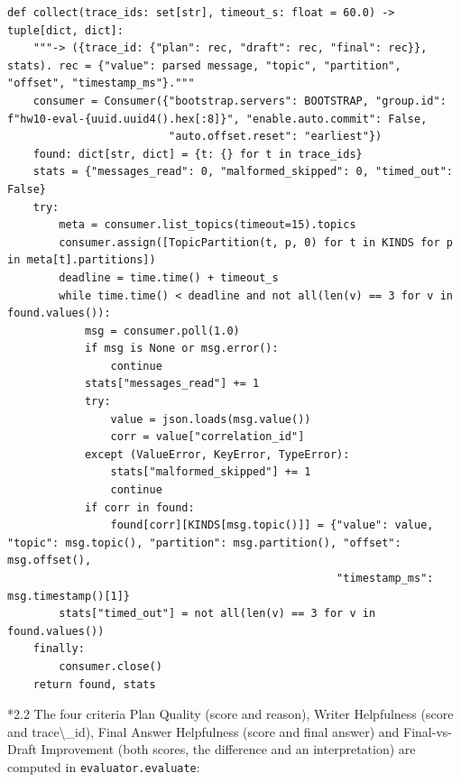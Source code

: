 \documentclass[11pt]{article}
\makeatletter
\renewcommand\subsection{\@startsection{subsection}{2}{\z@}{-2.2ex \@plus -1ex \@minus -.2ex}{0.8ex \@plus.2ex}{\normalfont\fontsize{12}{14.5}\selectfont\bfseries}}
\makeatother
\begin{document}
\begin{lstlisting}
def collect(trace_ids: set[str], timeout_s: float = 60.0) -> tuple[dict, dict]:
    """-> ({trace_id: {"plan": rec, "draft": rec, "final": rec}}, stats). rec = {"value": parsed message, "topic", "partition", "offset", "timestamp_ms"}."""
    consumer = Consumer({"bootstrap.servers": BOOTSTRAP, "group.id": f"hw10-eval-{uuid.uuid4().hex[:8]}", "enable.auto.commit": False,
                         "auto.offset.reset": "earliest"})
    found: dict[str, dict] = {t: {} for t in trace_ids}
    stats = {"messages_read": 0, "malformed_skipped": 0, "timed_out": False}
    try:
        meta = consumer.list_topics(timeout=15).topics
        consumer.assign([TopicPartition(t, p, 0) for t in KINDS for p in meta[t].partitions])
        deadline = time.time() + timeout_s
        while time.time() < deadline and not all(len(v) == 3 for v in found.values()):
            msg = consumer.poll(1.0)
            if msg is None or msg.error():
                continue
            stats["messages_read"] += 1
            try:
                value = json.loads(msg.value())
                corr = value["correlation_id"]
            except (ValueError, KeyError, TypeError):
                stats["malformed_skipped"] += 1
                continue
            if corr in found:
                found[corr][KINDS[msg.topic()]] = {"value": value, "topic": msg.topic(), "partition": msg.partition(), "offset": msg.offset(),
                                                   "timestamp_ms": msg.timestamp()[1]}
        stats["timed_out"] = not all(len(v) == 3 for v in found.values())
    finally:
        consumer.close()
    return found, stats
\end{lstlisting}
\endgroup
\subsection*{2.2 The four criteria}
Plan Quality (score and reason), Writer Helpfulness (score and trace\textbackslash{}\_\allowbreak{}id), Final Answer Helpfulness (score and final answer) and Final-vs-Draft Improvement (both scores, the difference and an interpretation) are computed in \texttt{evaluator.evaluate}:
\end{document}
